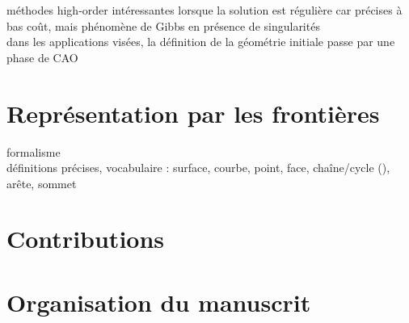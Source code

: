 méthodes high-order intéressantes lorsque la solution est régulière car précises à bas coût, mais phénomène de Gibbs en présence de singularités \cite{bruno2007}\\

dans les applications visées, la définition de la géométrie initiale passe par une phase de CAO


\section*{Représentation par les frontières}
formalisme \brep~ \cite[Section 2.2]{pentcheva2010}\\
définitions précises, vocabulaire : surface, courbe, point, face, chaîne/cycle (), arête, sommet


\section*{Contributions}%


\section*{Organisation du manuscrit}